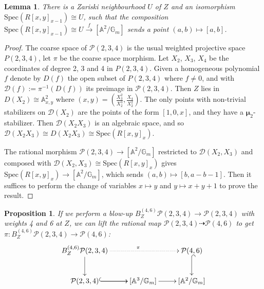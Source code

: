 \documentclass[11pt]{amsart}
\newtheorem{lemma}[theorem]{Lemma}
\newtheorem{prop}[theorem]{Proposition}
\theoremstyle{definition}
\theoremstyle{remark}
\newcommand{\calP}{\mathcal P}
\newcommand{\calD}{\mathcal D}
\newcommand{\bmu}{\boldsymbol{\mu}}
\newcommand{\bG}{\mathbb{G}}
\newcommand{\Spec}{\mathrm{Spec}}
\begin{document}
\begin{lemma}\label{lemma_local_desc_of_calP_around_z}
There is a Zariski neighbourhood $U$ of $Z$ and an isomorphism $\Spec(R[x,y]_{x-1})\cong U$, such that the composition $\Spec(R[x,y]_{x-1})\cong U \xrightarrow{f}[\mathbb{A}^2/\bG_m]$ sends a point $(a,b)\mapsto [a,b]$.
\end{lemma}\begin{proof}
The coarse space of $\calP(2,3,4)$ is the usual weighted projective space $P(2,3,4)$, let $\pi$ be the coarse space morphism.
Let $X_2$, $X_3$, $X_4$ be the coordinates of degree 2, 3 and 4 in $P(2,3,4)$. Given a homogeneous polynomial $f$ denote by $D(f)$ the open subset of $P(2,3,4)$ where $f \neq 0$, and with $\calD(f):=\pi^{-1}(D(f))$ its preimage in $\calP(2,3,4)$. Then $Z$ lies in $D(X_2)\cong \mathbb{A}^2_{x,y}$ where $(x,y)=(\frac{X^2_3}{X_2^3},\frac{X_4}{X_2^2})$. The only points with non-trivial stabilizers on $\calD(X_2)$ are the points of the form $[1,0,x]$, and they have a $\bmu_2$-stabilizer. Then $\calD(X_2X_3)$ is an algebraic space, and so $\calD(X_2X_3) \cong D(X_2X_3)\cong \Spec(R[x,y]_x)$.

The rational morphism $\calP(2,3,4)\to [\mathbb{A}^2/\bG_m]$ restricted to $\calD(X_2,X_3)$ and composed with $\calD(X_2,X_3) \cong \Spec(R[x,y]_x)$ gives $\Spec(R[x,y]_x)\to  [\mathbb{A}^2/\bG_m]$, which sends $(a,b)\mapsto [b,a-b-1]$. Then it suffices to perform the change of variables $x \mapsto y$ and $y\mapsto x+y+1$ to prove the result.
\end{proof}
\begin{prop}
If we perform a blow-up $B_Z^{(4,6)}\calP(2,3,4) \to \calP(2,3,4)$ with weights 4 and 6 at $Z$, we can lift the rational map $\calP(2,3,4)\dashrightarrow \calP(4,6)$ to get 
 $\pi:B_Z^{(4,6)}\calP(2,3,4) \to \calP(4,6)$:
 $$\xymatrix{B_Z^{(4,6)}\calP(2,3,4)  \ar[d] \ar@{.>}[rr]^\pi & & \calP(4,6)\ar@{^{(}->}[d]\\ \calP(2,3,4) \ar@{^{(}->}[r] \ar[r] & [\mathbb{A}^3/\bG_m]\ar[r] & [\mathbb{A}^2/\bG_m] }$$
\end{prop}
\end{document}
